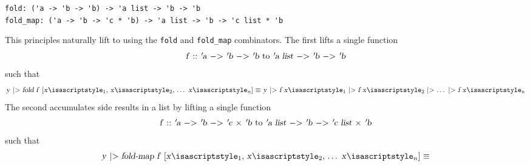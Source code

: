 \begin{isabellebody}
\begin{isamarkuptext}
\begin{quotation}
  \end{quotation}%
\end{isamarkuptext}%
\isamarkuptrue%
%
\isadelimmlref
%
\endisadelimmlref
%
\isatagmlref
%
\begin{isamarkuptext}%
\begin{mldecls}
  \verb|fold: ('a -> 'b -> 'b) -> 'a list -> 'b -> 'b| \\
  \verb|fold_map: ('a -> 'b -> 'c * 'b) -> 'a list -> 'b -> 'c list * 'b| \\
  \end{mldecls}%
\end{isamarkuptext}%
\isamarkuptrue%
%
\endisatagmlref
{\isafoldmlref}%
%
\isadelimmlref
%
\endisadelimmlref
%
\begin{isamarkuptext}%
\noindent This principles naturally lift to  using
  the \verb|fold| and \verb|fold_map| combinators.
  The first lifts a single function
  \[
    \mbox{\isa{f\ {\isasymColon}\ {\isacharprime}a\ {\isacharminus}{\isachargreater}\ {\isacharprime}b\ {\isacharminus}{\isachargreater}\ {\isacharprime}b} to \isa{{\isacharprime}a\ list\ {\isacharminus}{\isachargreater}\ {\isacharprime}b\ {\isacharminus}{\isachargreater}\ {\isacharprime}b}}
  \]
  such that
  \[
    \mbox{\isa{y\ {\isacharbar}{\isachargreater}\ fold\ f\ {\isacharbrackleft}x\isactrlisub {\isadigit{1}}{\isacharcomma}\ x\isactrlisub {\isadigit{2}}{\isacharcomma}\ {\isasymdots}\ x\isactrlisub n{\isacharbrackright}\ {\isasymequiv}\ y\ {\isacharbar}{\isachargreater}\ f\ x\isactrlisub {\isadigit{1}}\ {\isacharbar}{\isachargreater}\ f\ x\isactrlisub {\isadigit{2}}\ {\isacharbar}{\isachargreater}\ {\isasymdots}\ {\isacharbar}{\isachargreater}\ f\ x\isactrlisub n}}
  \]
  The second accumulates side results in a list by lifting
  a single function
  \[
    \mbox{\isa{f\ {\isasymColon}\ {\isacharprime}a\ {\isacharminus}{\isachargreater}\ {\isacharprime}b\ {\isacharminus}{\isachargreater}\ {\isacharprime}c\ {\isasymtimes}\ {\isacharprime}b} to \isa{{\isacharprime}a\ list\ {\isacharminus}{\isachargreater}\ {\isacharprime}b\ {\isacharminus}{\isachargreater}\ {\isacharprime}c\ list\ {\isasymtimes}\ {\isacharprime}b}}
  \]
  such that
  \[
    \mbox{\isa{y\ {\isacharbar}{\isachargreater}\ fold{\isacharunderscore}map\ f\ {\isacharbrackleft}x\isactrlisub {\isadigit{1}}{\isacharcomma}\ x\isactrlisub {\isadigit{2}}{\isacharcomma}\ {\isasymdots}\ x\isactrlisub n{\isacharbrackright}\ {\isasymequiv}}} \\
\]
\end{isamarkuptext}
\end{isabellebody}
